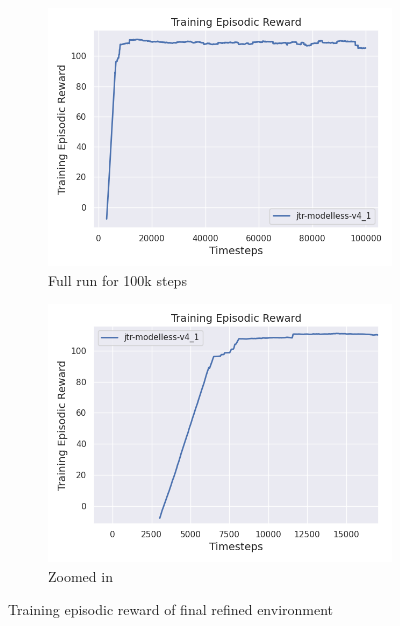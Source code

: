 \documentclass[12pt,twoside]{report}
\begin{document}
\begin{figure}[h]
    \centering
    \begin{subfigure}[b]{0.48\textwidth}
        \centering
        \includegraphics[width=\textwidth]{figures/rl-refinements/modelless-v4 100k steps.png}
        \caption{Full run for 100k steps}
    \end{subfigure}
    \begin{subfigure}[b]{0.48\textwidth}
        \centering
        \includegraphics[width=\textwidth]{figures/rl-refinements/modelless-v4 zoomed in.png}
        \caption{Zoomed in}
    \end{subfigure}
    \caption{Training episodic reward of final refined environment}
    \label{fig:modelless-v4}
\end{figure}
\end{document}
